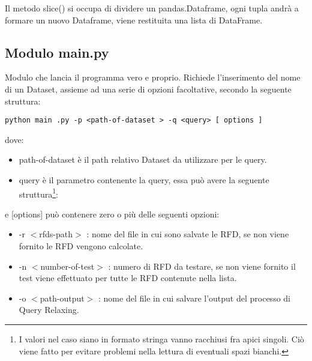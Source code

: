 Il metodo slice() si occupa di dividere un pandas.Dataframe, ogni tupla andrà a formare un nuovo Dataframe, viene restituita una lista di DataFrame.

\subsection{Modulo main.py}
Modulo che lancia il programma vero e proprio. Richiede
l'inserimento del nome di un Dataset, assieme ad una serie di opzioni
facoltative, secondo la seguente struttura:
\begin{listing}[H]
\begin{verbatim}
python main .py -p <path-of-dataset > -q <query> [ options ]
\end{verbatim}
\end{listing}

dove:
\begin{itemize}
\item path-of-dataset è il path relativo Dataset da utilizzare per le query.
\item query è il parametro contenente la query, essa può avere la seguente struttura\footnote{I valori nel caso siano in formato stringa vanno racchiusi fra apici singoli. Ciò viene fatto per evitare problemi nella lettura di eventuali spazi bianchi.}:
\end{itemize}
e [options] può contenere zero o più delle seguenti opzioni:

\begin{itemize}
\item -r $<$rfds-path$>$ : nome del file in cui sono salvate le RFD, se non viene fornito le RFD vengono calcolate.
\item -n $<$number-of-test$>$ : numero di RFD da testare, se non viene fornito il test viene effettuato per tutte le RFD contenute nella lista.
\item -o $<$path-output$>$ : nome del file in cui salvare l'output del processo di Query Relaxing.
\end{itemize}



